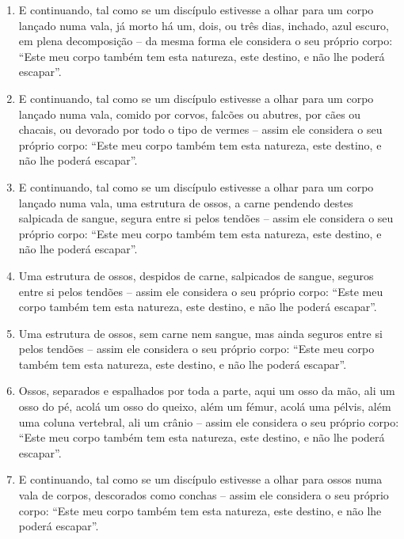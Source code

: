 \begin{enumerate}
  \item E continuando, tal como se um discípulo estivesse a olhar para um corpo
        lançado numa vala, já morto há um, dois, ou três dias, inchado, azul
        escuro, em plena decomposição -- da mesma forma ele considera o seu
        próprio corpo: “Este meu corpo também tem esta natureza, este destino,
        e não lhe poderá escapar”.

  \item E continuando, tal como se um discípulo estivesse a olhar para um corpo
        lançado numa vala, comido por corvos, falcões ou abutres, por cães ou
        chacais, ou devorado por todo o tipo de vermes -- assim ele considera o
        seu próprio corpo: “Este meu corpo também tem esta natureza, este
        destino, e não lhe poderá escapar”.

  \item E continuando, tal como se um discípulo estivesse a olhar para um corpo
        lançado numa vala, uma estrutura de ossos, a carne pendendo destes
        salpicada de sangue, segura entre si pelos tendões -- assim ele
        considera o seu próprio corpo: “Este meu corpo também tem esta
        natureza, este destino, e não lhe poderá escapar”.

  \item Uma estrutura de ossos, despidos de carne, salpicados de sangue, seguros
        entre si pelos tendões -- assim ele considera o seu próprio corpo:
        “Este meu corpo também tem esta natureza, este destino, e não lhe
        poderá escapar”.

  \item Uma estrutura de ossos, sem carne nem sangue, mas ainda seguros entre si
        pelos tendões -- assim ele considera o seu próprio corpo: “Este meu
        corpo também tem esta natureza, este destino, e não lhe poderá
        escapar”.

  \item Ossos, separados e espalhados por toda a parte, aqui um osso da mão, ali
        um osso do pé, acolá um osso do queixo, além um fémur, acolá uma pélvis,
        além uma coluna vertebral, ali um crânio -- assim ele considera o seu
        próprio corpo: “Este meu corpo também tem esta natureza, este destino,
        e não lhe poderá escapar”.

  \item E continuando, tal como se um discípulo estivesse a olhar para ossos
        numa vala de corpos, descorados como conchas -- assim ele considera o
        seu próprio corpo: “Este meu corpo também tem esta natureza, este
        destino, e não lhe poderá escapar”.


\end{enumerate}
